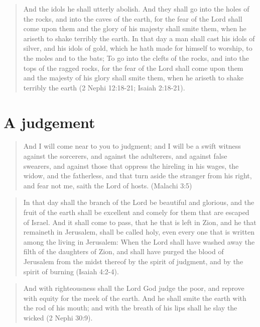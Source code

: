 \begin{quotation}
And the idols he shall utterly abolish. And they shall go into the holes of the rocks, and into the caves of the earth, for the fear of the Lord shall come upon them and the glory of his majesty shall smite them, when he ariseth to shake terribly the earth. In that day a man shall cast his idols of silver, and his idols of gold, which he hath made for himself to worship, to the moles and to the bats; To go into the clefts of the rocks, and into the tops of the ragged rocks, for the fear of the Lord shall come upon them and the majesty of his glory shall smite them, when he ariseth to shake terribly the earth (2 Nephi 12:18-21; Isaiah 2:18-21).
\end{quotation}


\section{A judgement}

\begin{quotation}
And I will come near to you to judgment; and I will be a swift witness against the sorcerers, and against the adulterers, and against false swearers, and against those that oppress the hireling in his wages, the widow, and the fatherless, and that turn aside the stranger from his right, and fear not me, saith the Lord of hosts. (Malachi 3:5)
\end{quotation}

\begin{quotation}
In that day shall the branch of the Lord be beautiful and glorious, and the fruit of the earth shall be excellent and comely for them that are escaped of Israel. And it shall come to pass, that he that is left in Zion, and he that remaineth in Jerusalem, shall be called holy, even every one that is written among the living in Jerusalem: When the Lord shall have washed away the filth of the daughters of Zion, and shall have purged the blood of Jerusalem from the midst thereof by the spirit of judgment, and by the spirit of burning (Isaiah 4:2-4).
\end{quotation}

\begin{quotation}
And with righteousness shall the Lord God judge the poor, and reprove with equity for the meek of the earth. And he shall smite the earth with the rod of his mouth; and with the breath of his lips shall he slay the wicked (2 Nephi 30:9).
\end{quotation}

